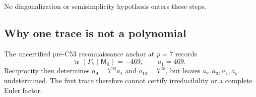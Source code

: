 No diagonalization or semisimplicity hypothesis enters these steps.

\subsection{Why one trace is not a polynomial}

The uncertified pre-C53 reconnaissance anchor at \(p=7\) records
\[
\operatorname{tr}(F_7\mid\mathsf M_0)=-469,
\qquad a_1=469.
\]
Reciprocity then determines \(a_9=7^{20}a_1\) and
\(a_{10}=7^{25}\), but leaves \(a_2,a_3,a_4,a_5\) undetermined.
The first trace therefore cannot certify irreducibility or a complete
Euler factor.
